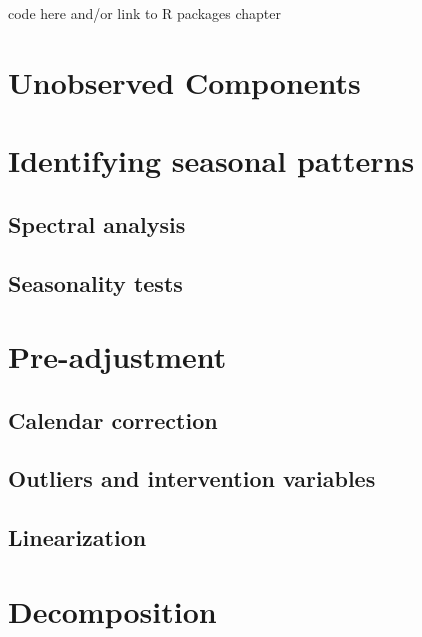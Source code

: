 \documentclass[
  letterpaper,
  DIV=11,
  numbers=noendperiod]{scrreprt}
\begin{document}
code here and/or link to R packages chapter

\hypertarget{unobserved-components}{%
\section{Unobserved Components}\label{unobserved-components}}

\hypertarget{identifying-seasonal-patterns}{%
\section{Identifying seasonal
patterns}\label{identifying-seasonal-patterns}}

\hypertarget{spectral-analysis}{%
\subsection{Spectral analysis}\label{spectral-analysis}}

\hypertarget{seasonality-tests}{%
\subsection{Seasonality tests}\label{seasonality-tests}}

\hypertarget{pre-adjustment}{%
\section{Pre-adjustment}\label{pre-adjustment}}

\hypertarget{calendar-correction-1}{%
\subsection{Calendar correction}\label{calendar-correction-1}}

\hypertarget{outliers-and-intervention-variables}{%
\subsection{Outliers and intervention
variables}\label{outliers-and-intervention-variables}}

\hypertarget{linearization}{%
\subsection{Linearization}\label{linearization}}

\hypertarget{decomposition}{%
\section{Decomposition}\label{decomposition}}
\end{document}
